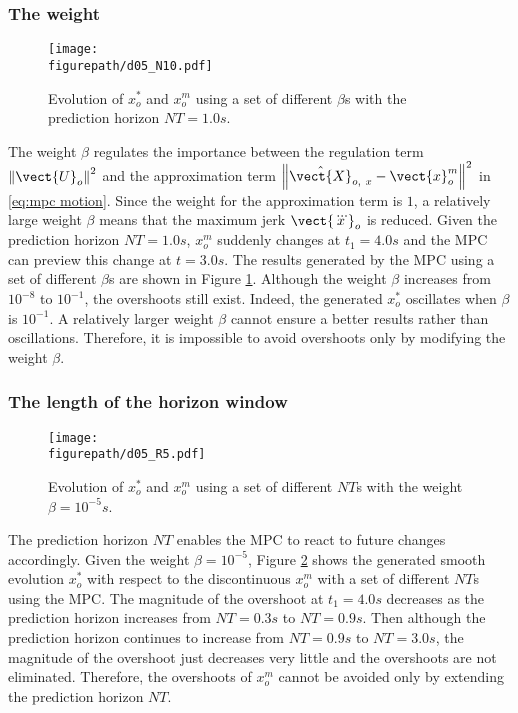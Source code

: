 \subsubsection{The weight}

\begin{figure}[!h]
\centering
\texttt{[image: \\figurepath/d05\_N10.pdf]}
\caption{Evolution of $x_o^*$ and $x_o^m$ using a set of different $\beta$s with the prediction horizon $NT=1.0s$.}
\label{fig:weight analysis}
\end{figure}

The weight $\beta$ regulates the importance between the regulation term $\left\|\vect{U}_o \right\|^2$ and the approximation term $\left\|\hat{\vect{X}}_{o,~x}-\vect{x}^{m}_{o}\right\|^2$ in \eqref{eq:mpc motion}. Since the weight for the approximation term is $1$, a relatively large weight $\beta$ means that the maximum jerk $\vect{\dddot{x}}_o$ is reduced. Given the prediction horizon $NT=1.0s$, $x_o^m$ suddenly changes at $t_1=4.0s$ and the MPC can preview this change at $t=3.0s$. The results generated by the MPC using a set of different $\beta$s are shown in Figure \ref{fig:weight analysis}. Although the weight $\beta$ increases from $10^{-8}$ to $10^{-1}$, the overshoots still exist. Indeed, the generated $x_o^*$ oscillates when $\beta$ is $10^{-1}$. A relatively larger weight $\beta$ cannot ensure a better results rather than oscillations. Therefore, it is impossible to avoid overshoots only by modifying the weight $\beta$. 

\subsubsection{The length of the horizon window}

\begin{figure}[!h]
\centering
\texttt{[image: \\figurepath/d05\_R5.pdf]}
\caption{Evolution of $x_o^*$ and $x_o^m$ using a set of different $NT$s with the weight $\beta=10^{-5}s$.}
\label{fig:horizon analysis}
\end{figure}

The prediction horizon $NT$ enables the MPC to react to future changes accordingly. Given the weight $\beta=10^{-5}$, Figure \ref{fig:horizon analysis} shows the generated smooth evolution $x_o^*$ with respect to the discontinuous $x_o^m$ with a set of different $NT$s using the MPC. The magnitude of the overshoot at $t_1=4.0s$ decreases as the prediction horizon increases from $NT=0.3s$ to $NT=0.9s$. Then although the prediction horizon continues to increase from $NT=0.9s$ to $NT=3.0s$, the magnitude of the overshoot just decreases very little and the overshoots are not eliminated. Therefore, the overshoots of $x_o^m$ cannot be avoided only by extending the prediction horizon $NT$.


